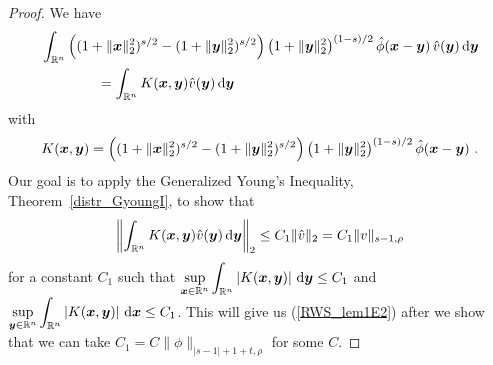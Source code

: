 \begin{proof}
We have
\begin{align*}
&\int_{\mathbb{R}^n} \left( (1+\|{\bm{x}}\|_2^2)^{s/2} - (1+\|{\bm{y}}\|_2^2)^{s/2}\right)
\left( 1 + \|{\bm{y}}\|_2^2\right)^{(1-s)/2} \hat{\phi}({\bm{x}}-{\bm{y}}) \,
\hat{v}({\bm{y}}) \,\mathrm{d}{{\bm{y}}} \\
& \qquad \qquad
= \int_{\mathbb{R}^n} K({\bm{x}},{\bm{y}}) \hat{v}({\bm{y}}) \,\mathrm{d}{{\bm{y}}}
\end{align*}
with
\[
K({\bm{x}},{\bm{y}}) =
\left( (1+\|{\bm{x}}\|_2^2)^{s/2} - (1+\|{\bm{y}}\|_2^2)^{s/2}\right)
\left( 1 + \|{\bm{y}}\|_2^2\right)^{(1-s)/2}
\hat{\phi}({\bm{x}}-{\bm{y}}) \ .
\]
Our goal is to apply the Generalized Young's Inequality,
Theorem~\ref{distr_GyoungI}, to show that
\[
\left\| \int_{\mathbb{R}^n} K({\bm{x}},{\bm{y}}) \hat{v}({\bm{y}}) \,\mathrm{d}{{\bm{y}}}
\right\|_2 \leq C_1 \|\hat{v}\|_2 = C_1 \|v\|_{s-1,\rho}
\]
for a constant $C_1$ such that
$\displaystyle
\sup_{{\bm{x}}\in \mathbb{R}^n} \int_{\mathbb{R}^n} \left|K({\bm{x}},{\bm{y}})\right| \,\mathrm{d}{{\bm{y}}}
\leq C_1$
and
$\displaystyle
\sup_{{\bm{y}}\in \mathbb{R}^n} \int_{\mathbb{R}^n} \left|K({\bm{x}},{\bm{y}})\right|
\,\mathrm{d}{{\bm{x}}} \leq C_1$.
This will give us (\ref{RWS_lem1E2}) after we show that we can take
$C_1 = C \|\phi\|_{|s-1|+1+t,\rho}$ for some $C$.


\end{proof}

